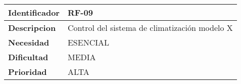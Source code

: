 \begin{center}
    \begin{tabular}{|p{2.6cm}|p{12cm}|}
    \hline
    \textbf{Identificador} & RF-09\\
    \hline
    \textbf{Descripcion} & Control del sistema de climatización modelo X\\
    \hline
    \textbf{Necesidad} & ESENCIAL\\
    \hline
    \textbf{Dificultad} & MEDIA\\
    \hline
    \textbf{Prioridad} & ALTA\\
    \hline
    \end{tabular}
\end{center}

